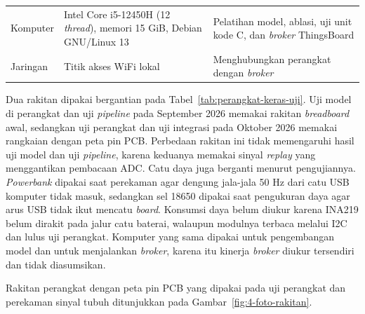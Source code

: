 \begin{table}[!ht]
\begin{tabularx}{\linewidth}{>{\RaggedRight\arraybackslash}p{2.4cm}>{\RaggedRight\arraybackslash}X>{\RaggedRight\arraybackslash}X}
    Komputer & Intel Core i5-12450H (12 \textit{thread}), memori 15 GiB, Debian GNU/Linux 13 & Pelatihan model, ablasi, uji unit kode C, dan \textit{broker} ThingsBoard \\
    Jaringan & Titik akses WiFi lokal & Menghubungkan perangkat dengan \textit{broker} \\
    \bottomrule
  \end{tabularx}
  \par\vspace{2pt}{\footnotesize\raggedright Keterangan: tiga catu daya pada baris Catu daya berpasangan urut dengan tiga kegunaannya.\par}
\end{table}

Dua rakitan dipakai bergantian pada Tabel~\ref{tab:perangkat-keras-uji}. Uji model di perangkat dan uji \textit{pipeline} pada September 2026 memakai rakitan \textit{breadboard} awal, sedangkan uji perangkat dan uji integrasi pada Oktober 2026 memakai rangkaian dengan peta pin PCB. Perbedaan rakitan ini tidak memengaruhi hasil uji model dan uji \textit{pipeline}, karena keduanya memakai sinyal \textit{replay} yang menggantikan pembacaan ADC. Catu daya juga berganti menurut pengujiannya. \textit{Powerbank} dipakai saat perekaman agar dengung jala-jala 50 Hz dari catu USB komputer tidak masuk, sedangkan sel 18650 dipakai saat pengukuran daya agar arus USB tidak ikut mencatu \textit{board}. Konsumsi daya belum diukur karena INA219 belum dirakit pada jalur catu baterai, walaupun modulnya terbaca melalui I2C dan lulus uji perangkat. Komputer yang sama dipakai untuk pengembangan model dan untuk menjalankan \textit{broker}, karena itu kinerja \textit{broker} diukur tersendiri dan tidak diasumsikan.

Rakitan perangkat dengan peta pin PCB yang dipakai pada uji perangkat dan perekaman sinyal tubuh ditunjukkan pada Gambar~\ref{fig:4-foto-rakitan}.

